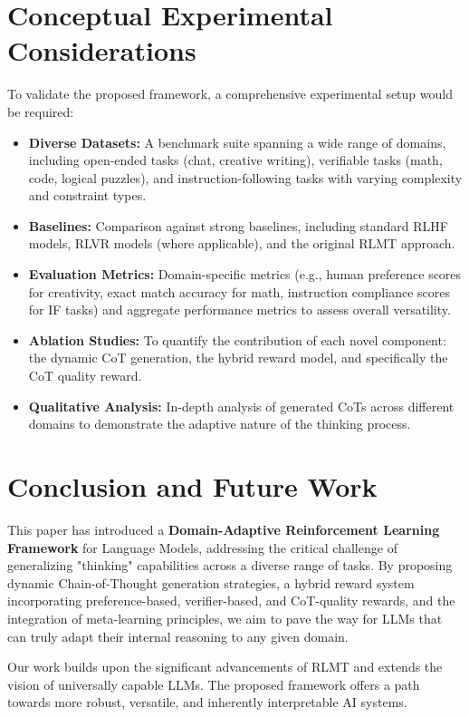 \documentclass{article}
\begin{document}
\section{Conceptual Experimental Considerations}
\label{sec:experiments}
To validate the proposed framework, a comprehensive experimental setup would be required:
\begin{itemize}
    \item \textbf{Diverse Datasets:} A benchmark suite spanning a wide range of domains, including open-ended tasks (chat, creative writing), verifiable tasks (math, code, logical puzzles), and instruction-following tasks with varying complexity and constraint types.
    \item \textbf{Baselines:} Comparison against strong baselines, including standard RLHF models, RLVR models (where applicable), and the original RLMT approach.
    \item \textbf{Evaluation Metrics:} Domain-specific metrics (e.g., human preference scores for creativity, exact match accuracy for math, instruction compliance scores for IF tasks) and aggregate performance metrics to assess overall versatility.
    \item \textbf{Ablation Studies:} To quantify the contribution of each novel component: the dynamic CoT generation, the hybrid reward model, and specifically the CoT quality reward.
    \item \textbf{Qualitative Analysis:} In-depth analysis of generated CoTs across different domains to demonstrate the adaptive nature of the thinking process.
\end{itemize}

\section{Conclusion and Future Work}
\label{sec:conclusion}
This paper has introduced a \textbf{Domain-Adaptive Reinforcement Learning Framework} for Language Models, addressing the critical challenge of generalizing "thinking" capabilities across a diverse range of tasks. By proposing dynamic Chain-of-Thought generation strategies, a hybrid reward system incorporating preference-based, verifier-based, and CoT-quality rewards, and the integration of meta-learning principles, we aim to pave the way for LLMs that can truly adapt their internal reasoning to any given domain.

Our work builds upon the significant advancements of RLMT \cite{bhaskar2025language} and extends the vision of universally capable LLMs. The proposed framework offers a path towards more robust, versatile, and inherently interpretable AI systems.
\end{document}
